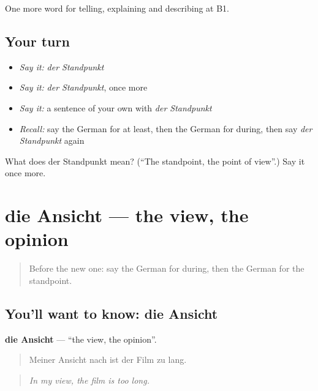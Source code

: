 \begin{grammarlens}[title={What you've built}]
One more word for telling, explaining and describing at B1.
\end{grammarlens}

\subsection*{Your turn}
\begin{itemize}
\raggedright
  \item \emph{Say it:} \emph{der Standpunkt}
  \item \emph{Say it:} \emph{der Standpunkt}, once more
  \item \emph{Say it:} a sentence of your own with \emph{der Standpunkt}
  \item \emph{Recall:} say the German for at least, then the German for during, then say \emph{der Standpunkt} again
\end{itemize}

\begin{tcolorbox}[breakable,colback=teal!4,colframe=teal!35!black,title={Before you move on}]
What does der Standpunkt mean? (\textquotedblleft{}The standpoint, the point of view\textquotedblright{}.) Say it once more.
\end{tcolorbox}
\section[die Ansicht]{die Ansicht — the view, the opinion}

\label{lesson:GE-C330-ansicht}



\begin{quote}
Before the new one: say the German for during, then the German for the standpoint.
\end{quote}

\subsection*{You'll want to know: die Ansicht}
\textbf{die Ansicht} — \textquotedblleft{}the view, the opinion\textquotedblright{}.

\begin{quote}
Meiner Ansicht nach ist der Film zu lang.
\end{quote}

\begin{quote}
\emph{In my view, the film is too long.}
\end{quote}

